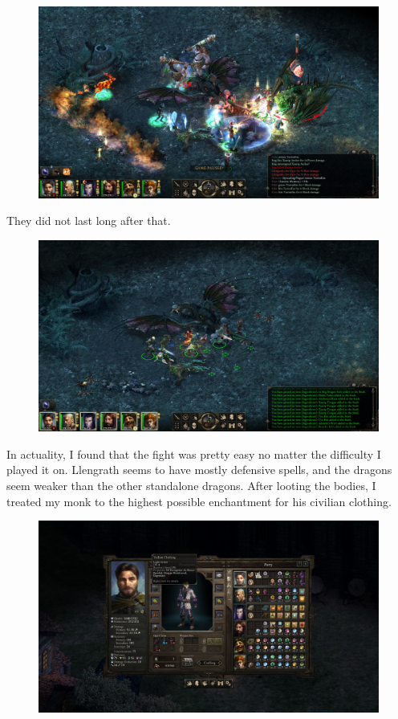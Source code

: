 \documentclass{article}
\begin{document}
\begin{figure}
\includegraphics[scale=0.33]{files/blog/2020_01_18_poe_potd_wmpt2/2020_01_18_llengrath5.jpg}
\end{figure}

They did not last long after that.

\begin{figure}
\includegraphics[scale=0.33]{files/blog/2020_01_18_poe_potd_wmpt2/2020_01_18_llengrath6.jpg}
\end{figure}

In actuality, I found that the fight was pretty easy no matter the difficulty I played it on.  Llengrath seems to have mostly defensive spells, and the dragons seem weaker than the other standalone dragons.  After looting the bodies, I treated my monk to the highest possible enchantment for his civilian clothing.

\begin{figure}
\includegraphics[scale=0.33]{files/blog/2020_01_18_poe_potd_wmpt2/2020_01_18_llengrath7.jpg}
\end{figure}
\end{document}
